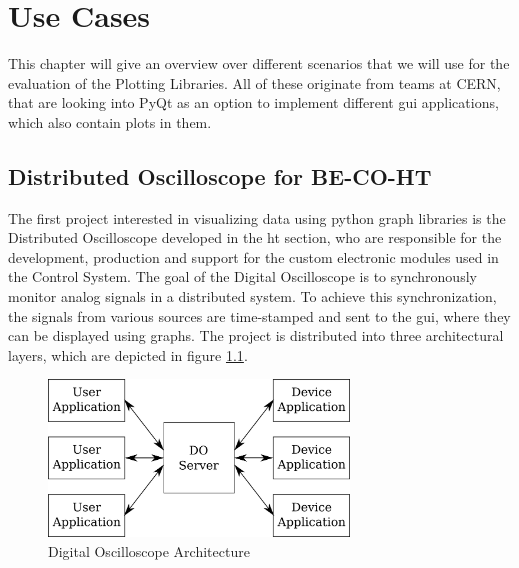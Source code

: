 
\chapter{Use Cases}
\label{ch:usecases}

This chapter will give an overview over different scenarios that we will use for
the evaluation of the Plotting Libraries. All of these originate from teams at
CERN, that are looking into PyQt as an option to implement different \gls{gui}
applications, which also contain plots in them.


\section{Distributed Oscilloscope for BE-CO-HT}
\label{sec:usecases:becoht}

The first project interested in visualizing data using python graph libraries is
the Distributed Oscilloscope developed in the \gls{ht} section, who are
responsible for the development, production and support for the custom
electronic modules used in the Control System. The goal of the Digital
Oscilloscope is to synchronously monitor analog signals in a distributed system.
To achieve this synchronization, the signals from various sources are
time-stamped and sent to the \gls{gui}, where they can be displayed using
graphs. The project is distributed into three architectural layers, which are
depicted in figure \ref{fig:doarchitecture}.

\begin{figure}[h]
    \centering
    \includegraphics[width=8cm]{resources/img/DoArchitecture}
    \caption{Digital Oscilloscope Architecture}
    \label{fig:doarchitecture}
\end{figure}

